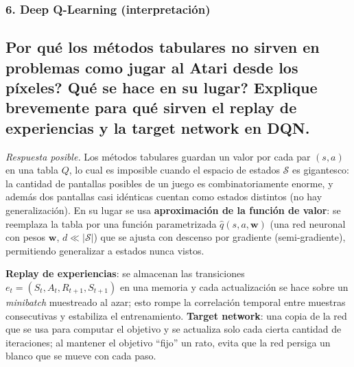 \documentclass[11pt, a4paper]{article}
\newcommand{\pregunta}[1]{\subsection{#1}}
\newcommand{\eje}[1]{\subsubsection{#1}}
\begin{document}
\eje{6. Deep Q-Learning (interpretaci\'on)}
\pregunta{\textquestiondown Por qu\'e los m\'etodos tabulares no sirven en problemas como jugar al Atari desde los p\'ixeles? \textquestiondown Qu\'e se hace en su lugar? Explique brevemente para qu\'e sirven el \textbf{replay de experiencias} y la \textbf{target network} en DQN.}

\begin{respuesta}
\textit{Respuesta posible.} Los m\'etodos tabulares guardan un valor por cada par $(s,a)$ en una tabla $Q$, lo cual es imposible cuando el espacio de estados $\mathcal{S}$ es gigantesco: la cantidad de pantallas posibles de un juego es combinatoriamente enorme, y adem\'as dos pantallas casi id\'enticas cuentan como estados distintos (no hay generalizaci\'on). En su lugar se usa \textbf{aproximaci\'on de la funci\'on de valor}: se reemplaza la tabla por una funci\'on parametrizada $\hat q(s,a,\mathbf{w})$ (una red neuronal con pesos $\mathbf{w}$, $d \ll |\mathcal{S}|$) que se ajusta con descenso por gradiente (semi-gradiente), permitiendo generalizar a estados nunca vistos.

\textbf{Replay de experiencias}: se almacenan las transiciones $e_t=(S_t,A_t,R_{t+1},S_{t+1})$ en una memoria y cada actualizaci\'on se hace sobre un \emph{minibatch} muestreado al azar; esto rompe la correlaci\'on temporal entre muestras consecutivas y estabiliza el entrenamiento. \textbf{Target network}: una copia de la red que se usa para computar el objetivo y se actualiza solo cada cierta cantidad de iteraciones; al mantener el objetivo ``fijo'' un rato, evita que la red persiga un blanco que se mueve con cada paso.
\end{respuesta}
\end{document}
